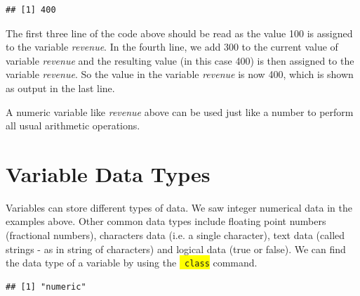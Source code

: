 \documentclass[10pt, letterpaper, twoside]{memoir}\usepackage{knitr}
\newcommand\rcommand[1]{
\colorbox{yellow}{\texttt{\color{red} #1}}
\index{R Commands!#1}
}
\begin{document}
\begin{knitrout}
\color{fgcolor}\begin{kframe}
\begin{alltt}
 \hlkwb{<-}   
 \hlkwb{=}   
 \hlkwb{<-}  \hlopt{+}   
  
\end{alltt}
\begin{verbatim}
## [1] 400
\end{verbatim}
\end{kframe}
\end{knitrout}

The first three line of the code above should be read as the value 100 is assigned to the variable \emph{revenue}. In the fourth line, we add 300 to the current value of variable \emph{revenue} and the resulting value (in this case 400) is then assigned to the variable \emph{revenue}. So the value in the variable \emph{revenue} is now 400, which is shown as output in the last line.

A numeric variable like \emph{revenue} above can be used just like a number to perform all usual arithmetic operations.

\section{Variable Data Types}

Variables can store  different types of data. We saw integer numerical data in the examples above. Other common data types include floating point numbers (fractional numbers), characters data (i.e. a single character), text data (called strings - as in string of characters) and logical data (true or false). We can find the data type of a variable by using the \rcommand{class} command.

\begin{knitrout}
\color{fgcolor}\begin{kframe}
\begin{alltt}
 \hlkwb{<-}   
  
\end{alltt}
\begin{verbatim}
## [1] "numeric"
\end{verbatim}
\end{kframe}
\end{knitrout}
\end{document}
